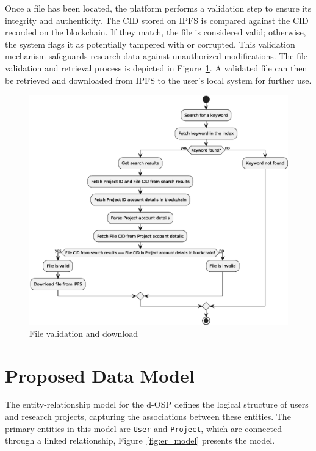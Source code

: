 \documentclass[final]{rc-book-2.14}
\begin{document}
Once a file has been located, the platform performs a validation step to ensure its integrity and authenticity. The CID stored on IPFS is compared against the CID recorded on the blockchain. If they match, the file is considered valid; otherwise, the system flags it as potentially tampered with or corrupted. This validation mechanism safeguards research data against unauthorized modifications. The file validation and retrieval process is depicted in Figure~\ref{fig:c4_file_validation}. A validated file can then be retrieved and downloaded from IPFS to the user's local system for further use.

\begin{figure}[htbp]
    \centering
    \includegraphics[scale=0.5]{fig/keyword_and_file_validation.eps}
    \caption{File validation and download}
    \label{fig:c4_file_validation}
\end{figure}


\section{Proposed Data Model}
\label{chp:proposed_model:sec:data_model}

The entity-relationship model for the d-OSP defines the logical structure of users and research projects, capturing the associations between these entities. The primary entities in this model are \texttt{User} and \texttt{Project}, which are connected through a linked relationship, Figure~\ref{fig:er_model} presents the model.
\end{document}
